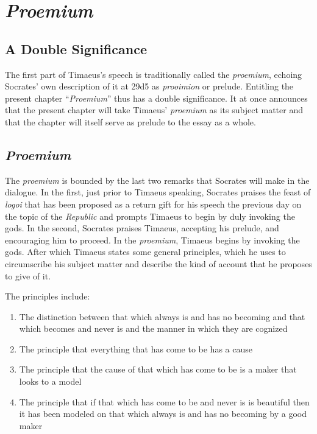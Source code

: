 
\chapter{\emph{Proemium}} %
\label{cha:proemium}

\section{A Double Significance} %
\label{sec:a_double_significance}

The first part of Timaeus's speech is traditionally called the \emph{proemium}, echoing Socrates' own description of it at 29d5 as \emph{prooimion} or prelude. Entitling the present chapter ``\emph{Proemium}'' thus has a double significance. It at once announces that the present chapter will take Timaeus' \emph{proemium} as its subject matter and that the chapter will itself serve as prelude to the essay as a whole.



\section{\emph{Proemium}} %
\label{sec:proemium}

The \emph{proemium} is bounded by the last two remarks that Socrates will make in the dialogue. In the first, just prior to Timaeus speaking, Socrates praises the feast of \emph{logoi} that has been proposed as a return gift for his speech the previous day on the topic of the \emph{Republic} and prompts Timaeus to begin by duly invoking the gods. In the second, Socrates praises Timaeus, accepting his prelude, and encouraging him to proceed. In the \emph{proemium}, Timaeus begins by invoking the gods. After which Timaeus states some general principles, which he uses to circumscribe his subject matter and describe the kind of account that he proposes to give of it. 

The principles include:
\begin{enumerate}[(1)]
	\item The distinction between that which always is and has no becoming and that which becomes and never is and the manner in which they are cognized
	\item The principle that everything that has come to be has a cause
	\item The principle that the cause of that which has come to be is a maker that looks to a model
	\item The principle that if that which has come to be and never is is beautiful then it has been modeled on that which always is and has no becoming by a good maker
\end{enumerate}

